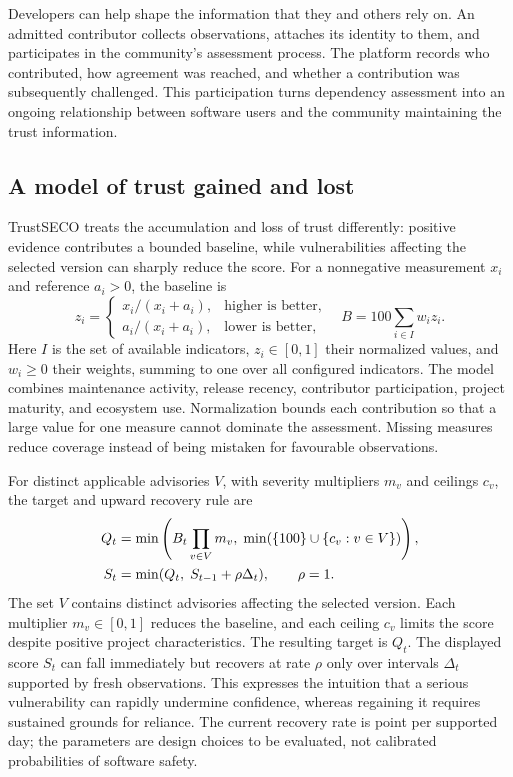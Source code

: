 \documentclass[10pt,conference]{IEEEtran}
\begin{document}
Developers can help shape the information that they and others rely on. An admitted contributor collects observations, attaches its identity to them, and participates in the community's assessment process. The platform records who contributed, how agreement was reached, and whether a contribution was subsequently challenged. This participation turns dependency assessment into an ongoing relationship between software users and the community maintaining the trust information.

\subsection{A model of trust gained and lost}
TrustSECO treats the accumulation and loss of trust differently: positive evidence contributes a bounded baseline, while vulnerabilities affecting the selected version can sharply reduce the score. For a nonnegative measurement $x_i$ and reference $a_i>0$, the baseline is
\begin{equation}
 z_i=\begin{cases}x_i/(x_i+a_i),&\text{higher is better},\\a_i/(x_i+a_i),&\text{lower is better},\end{cases}
 \quad B=100\sum_{i\in I}w_i z_i.
\label{eq:normalization}
\end{equation}
Here $I$ is the set of available indicators, $z_i\in[0,1]$ their normalized values, and $w_i\geq0$ their weights, summing to one over all configured indicators. The model combines maintenance activity, release recency, contributor participation, project maturity, and ecosystem use. Normalization bounds each contribution so that a large value for one measure cannot dominate the assessment. Missing measures reduce coverage instead of being mistaken for favourable observations.

For distinct applicable advisories $V$, with severity multipliers $m_v$ and ceilings $c_v$, the target and upward recovery rule are
\begin{equation}
\begin{aligned}
 Q_t&=\min\left(B_t\prod_{v\in V}m_v,\;\min(\{100\}\cup\{c_v:v\in V\})\right),\\
 S_t&=\min(Q_t,\;S_{t-1}+\rho\Delta_t),\qquad \rho=1.
\end{aligned}
\label{eq:score}
\end{equation}
The set $V$ contains distinct advisories affecting the selected version. Each multiplier $m_v\in[0,1]$ reduces the baseline, and each ceiling $c_v$ limits the score despite positive project characteristics. The resulting target is $Q_t$. The displayed score $S_t$ can fall immediately but recovers at rate $\rho$ only over intervals $\Delta_t$ supported by fresh observations. This expresses the intuition that a serious vulnerability can rapidly undermine confidence, whereas regaining it requires sustained grounds for reliance. The current recovery rate is \TrustRecovery{} point per supported day; the parameters are design choices to be evaluated, not calibrated probabilities of software safety.
\end{document}
